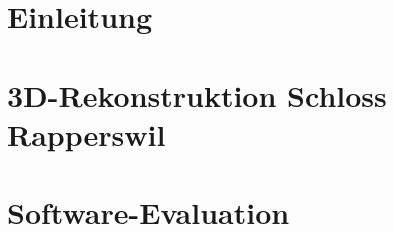



\cleardoublepage %

\cleardoublepage %

\pagestyle{scrheadings} %

\cleardoublepage %


\cleardoublepage %


\part{Einleitung}




\cleardoublepage %


\part{3D-Rekonstruktion Schloss Rapperswil}




\part{Software-Evaluation}

